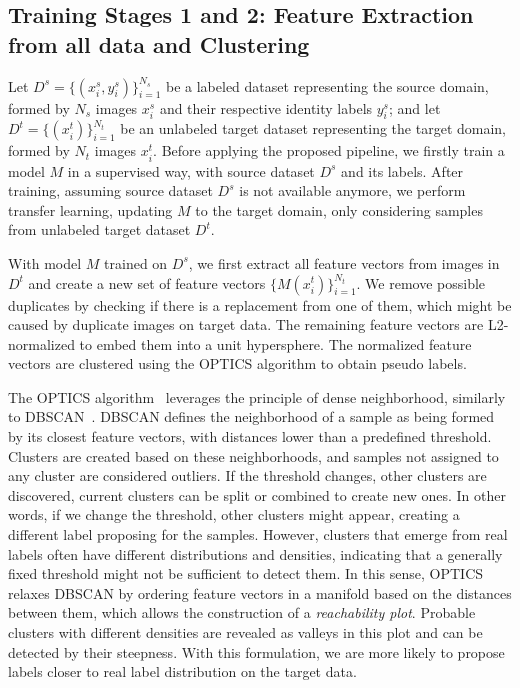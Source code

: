 \documentclass[journal]{IEEEtran}
\begin{document}
\subsection{Training Stages 1 and 2: Feature Extraction from all data and Clustering}
Let $ D^{s} = \{(x_{i}^{s}, y_{i}^{s})\}_{i=1}^{N_{s}} $ be a labeled dataset representing the source domain, formed by $ N_{s} $ images $x_{i}^{s}$ and their respective identity labels $y_{i}^{s}$; and  
let $ D^{t} = \{(x_{i}^{t})\}_{i=1}^{N_{t}} $ be an unlabeled target dataset representing the target domain, formed by $ N_{t} $ images $x_{i}^{t}$.  Before applying the proposed pipeline, we firstly train a model $M$ in a supervised way, with source dataset $D^{s}$ and its labels. After training, assuming source dataset $ D^{s}$ is not available anymore, we perform transfer learning, updating $M$ to the target domain, only considering samples from unlabeled target dataset $ D^{t} $.  

With model $M$ trained on $D^{s}$, we first extract all feature vectors from images in $ D^{t} $ and create a new set of feature vectors $\{ M(x_{i}^{t})\}_{i=1}^{N_{t}}$.
We remove possible duplicates by checking if there is a replacement from one of them, which might be caused by duplicate images on target data. The remaining feature vectors are L2-normalized to embed them into a unit hypersphere. The normalized feature vectors are clustered using the OPTICS algorithm to obtain pseudo labels. 

The OPTICS algorithm~\cite{ankerst1999optics} leverages the principle of dense neighborhood, similarly to DBSCAN~\cite{ester1996density}. DBSCAN defines the neighborhood of a sample as being formed by its closest feature vectors, with distances lower than a predefined threshold. Clusters are created based on these neighborhoods, and samples not assigned to any cluster are considered outliers. If the threshold changes, other clusters are discovered, current clusters can be split or combined to create new ones.  In other words, if we change the threshold, other clusters might appear, creating a different label proposing for the samples. However, clusters that emerge from real labels often have different distributions and densities, indicating that a generally fixed threshold might not be sufficient to detect them. In this sense, OPTICS relaxes DBSCAN by ordering feature vectors in a manifold based on the distances between them, which allows the construction of a \textit{reachability plot}. Probable clusters with different densities are revealed as valleys in this plot and can be detected by their steepness. With this formulation, we are more likely to propose labels closer to real label distribution on the target data.
\end{document}
